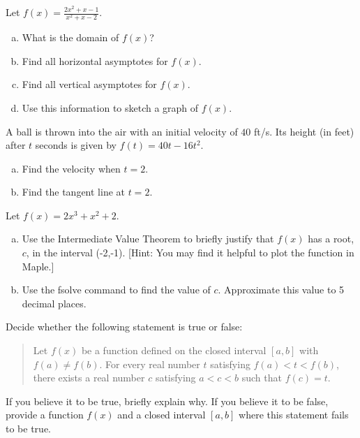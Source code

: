 \documentclass[10pt]{amsart}
\begin{document}
\begin{thm}[4 Points]
  Let $f(x) = \frac{2x^2 + x - 1}{x^2 + x - 2}$.
  \begin{enumerate}[(a)]
  \item
    What is the domain of $f(x)$?
    \vspace{.5in}
  \item
    Find all horizontal asymptotes for $f(x)$.
    \vspace{.5in}
  \item
    Find all vertical asymptotes for $f(x)$.
    \vspace{.5in}
  \item
    Use this information to sketch a graph of $f(x)$.
    \vspace{.5in}
  \end{enumerate}
\end{thm}
\pagebreak
\begin{thm}[2 Points]
  A ball is thrown into the air with an initial velocity of $40$ ft/s.
  Its height (in feet) after $t$ seconds is given by $f(t) = 40t - 16t^2$.
  \begin{enumerate}[(a)]
  \item
    Find the velocity when $t = 2$.
    \vspace{.5in}
  \item
    Find the tangent line at $t = 2$.
    \vspace{.5in}
  \end{enumerate}
\end{thm}

\begin{thm}[2 Points]
  Let $f(x) = 2x^3 + x^2 + 2$.
  \begin{enumerate}[(a)]
    \item
      Use the Intermediate Value Theorem to briefly justify that $f(x)$ has a root, $c$, in the interval (-2,-1).
      [Hint: You may find it helpful to plot the function in Maple.]
      \vspace{1.5in}
    \item
      Use the fsolve command to find the value of $c$.
      Approximate this value to 5 decimal places.
      \vspace{.5in}
  \end{enumerate}
\end{thm}

\begin{thm}
  Decide whether the following statement is true or false:
  \begin{quotation}
    Let $f(x)$ be a function defined on the closed interval $[a,b]$ with $f(a) \neq f(b)$.
    For every real number $t$ satisfying $f(a) < t < f(b)$, there exists a real number $c$ satisfying $a < c < b$ such that $f(c) = t$.
  \end{quotation}
  If you believe it to be true, briefly explain why.
  If you believe it to be false, provide a function $f(x)$ and a closed interval $[a,b]$ where this statement fails to be true.
\end{thm}
\end{document}
